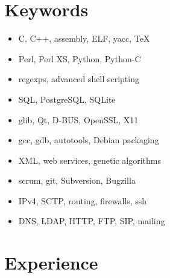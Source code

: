 \documentclass[a4paper,12pt]{article}
\newcommand{\compress}{\setlength\itemsep{-\parskip}}
\begin{document}
\section{Keywords}

\begin{multicols}{2}
\begin{itemize}\compress
\item	C, C++, assembly, ELF, yacc, \TeX
\item	Perl, Perl XS, Python, Python-C
\item	regexps, advanced shell scripting
\item	SQL, PostgreSQL, SQLite
\item	glib, Qt, D-BUS, OpenSSL, X11
\columnbreak
\item	gcc, gdb, autotools, Debian packaging
\item	XML, web services, genetic algorithms
\item	scrum, git, Subversion, Bugzilla
\item	IPv4, SCTP, routing, firewalls, ssh
\item	DNS, LDAP, HTTP, FTP, SIP, mailing 
\end{itemize}
\end{multicols}

\section{Experience}
\end{document}

